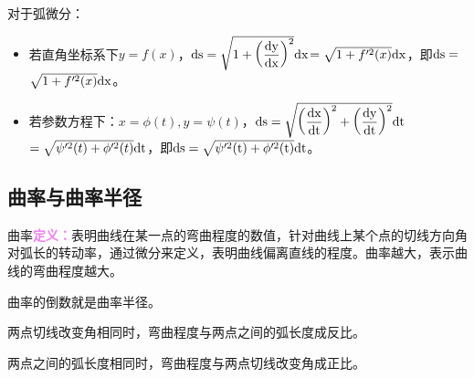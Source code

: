 \documentclass[UTF8, 12pt]{ctexart}
\begin{document}
对于弧微分：

\begin{itemize}
    \item 若直角坐标系下$y=f(x)$，$\rm{d}s=\sqrt{1+\left(\dfrac{\rm{d}y}{\rm{d}x}\right)^2}\rm{d}x$$=\sqrt{1+f'^2(x)}\rm{d}x$，即$\rm{d}s=$$\sqrt{1+f'^2(x)}\rm{d}x$。
    \item 若参数方程下：$x=\phi(t),y=\psi(t)$，$\rm{d}s=\sqrt{\left(\dfrac{\rm{d}x}{\rm{d}t}\right)^2+\left(\dfrac{\rm{d}y}{\rm{d}t}\right)^2}\rm{d}t$\medskip\\$=\sqrt{\psi'^2(t)+\phi'^2(t)}\rm{d}t$，即$\rm{d}s=\sqrt{\psi'^2(t)+\phi'^2(t)}\rm{d}t$。
\end{itemize}

\subsection{曲率与曲率半径}

曲率\textcolor{violet}{\textbf{定义：}}表明曲线在某一点的弯曲程度的数值，针对曲线上某个点的切线方向角对弧长的转动率，通过微分来定义，表明曲线偏离直线的程度。曲率越大，表示曲线的弯曲程度越大。

曲率的倒数就是曲率半径。\medskip

\begin{minipage}{0.5\linewidth}
    两点切线改变角相同时，弯曲程度与两点之间的弧长度成反比。

    两点之间的弧长度相同时，弯曲程度与两点切线改变角成正比。
\end{minipage}
\hfill
\begin{minipage}{0.2\linewidth}
\end{minipage}
\hfill
\begin{minipage}{0.2\linewidth}
\end{minipage}
\end{document}
